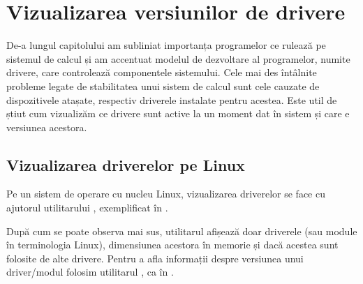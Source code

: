 \section{Vizualizarea versiunilor de drivere}
\label{sec:hw:driver-view}

De-a lungul capitolului am subliniat importanța programelor ce rulează pe sistemul de calcul și am accentuat modelul de dezvoltare al programelor, numite drivere, care controlează componentele sistemului.
Cele mai des întâlnite probleme legate de stabilitatea unui sistem de calcul sunt cele cauzate de dispozitivele atașate, respectiv driverele instalate pentru acestea.
Este util de știut cum vizualizăm ce drivere sunt active la un moment dat în sistem și care e versiunea acestora.

\subsection{Vizualizarea driverelor pe Linux}
\label{sec:hw:driver-view:linux}

Pe un sistem de operare cu nucleu Linux, vizualizarea driverelor se face cu ajutorul utilitarului , exemplificat în .


După cum se poate observa mai sus, utilitarul  afișează doar driverele (sau module în terminologia Linux), dimensiunea acestora în memorie și dacă acestea sunt folosite de alte drivere.
Pentru a afla informații despre versiunea unui driver/modul folosim utilitarul , ca în .


